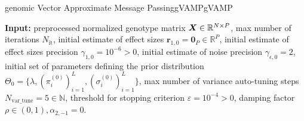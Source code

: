 \begin{breakablealgorithm}{genomic Vector Approximate Message Passing}{gVAMP}{gVAMP}
    \begin{algorithmic}[1]
        \STATE \parbox[t]{\dimexpr\linewidth-2\algorithmicindent}{%
        {\bfseries Input:} preprocessed normalized genotype matrix ${\boldsymbol X} \in \mathbb{R}^{N \times P}$, max number of iterations $N_{\text{it}}$, initial estimate of effect sizes $\bm{r}_{1,0} = \bm{0}_{P} \in \mathbb{R}^P$, initial estimate of effect sizes precision $\gamma_{1,0} = 10^{-6} > 0$, initial estimate of noise precision $\gamma_{\epsilon, 0}=2$, initial set of parameters defining the prior distribution $\Theta_{0} = \{\lambda, (\pi_{i}^{(0)})^{L}_{i=1}, \allowbreak (\sigma_{i}^{(0)})^{L}_{i=1} \}$, max number of variance auto-tuning steps $N_{\text{var\_tune}} = 5 \in \mathbb{N}$, threshold for stopping criterion $\varepsilon = 10^{-4} > 0$, damping factor $\rho \in (0, 1), \allowbreak \alpha_{2,-1} = 0.$}


\end{algorithmic}
\end{breakablealgorithm}
